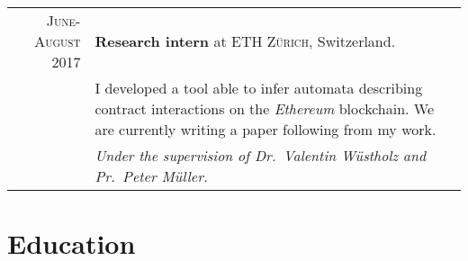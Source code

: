 \documentclass[a4paper,10pt]{article} %
\begin{document}
\begin{tabular}{r|p{10.5cm}}
\textsc{June-August 2017} & \textbf{Research intern} at \textsc{ETH Zürich}, Switzerland. \\ 
& {I developed a tool able to infer automata describing contract interactions on the \emph{Ethereum} blockchain. We are currently writing a paper following from my work.} \\ & \emph{Under the supervision of Dr.\ Valentin Wüstholz and Pr.\ Peter Müller.}\\




\end{tabular}


\section{Education}
\end{document}
